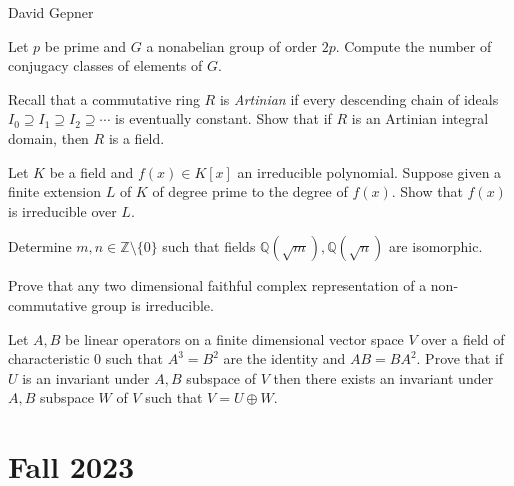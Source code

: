 \documentclass[openany]{book}
\begin{document}
David Gepner


\begin{prob}
    Let \( p \) be prime and \( G \) a nonabelian group of order \( 2p \). Compute the number of conjugacy classes of elements of \( G \).
\end{prob}


\begin{prob}
    Recall that a commutative ring \( R \) is \textit{Artinian} if every descending chain of ideals \( I_0 \supseteq I_1 \supseteq I_2 \supseteq \cdots \) is eventually constant. Show that if \( R \) is an Artinian integral domain, then \( R \) is a field.
\end{prob}




\begin{prob}
    Let \( K \) be a field and \( f(x) \in K[x] \) an irreducible polynomial. Suppose given a finite extension \( L \) of \( K \) of degree prime to the degree of \( f(x) \). Show that \( f(x) \) is irreducible over \( L \).
\end{prob}



\begin{prob}
    Determine \( m, n \in \mathbb{Z} \setminus \{0\} \) such that fields \( \mathbb{Q}(\sqrt{m}), \mathbb{Q}(\sqrt{n}) \) are isomorphic.
\end{prob}




\begin{prob}
    Prove that any two dimensional faithful complex representation of a non-commutative group is irreducible.
\end{prob}




\begin{prob}
    Let \( A, B \) be linear operators on a finite dimensional vector space \( V \) over a field of characteristic 0 such that \( A^3 = B^2 \) are the identity and \( AB = BA^2 \). Prove that if \( U \) is an invariant under \( A, B \) subspace of \( V \) then there exists an invariant under \( A, B \) subspace \( W \) of \( V \) such that \( V = U \oplus W \).
\end{prob}



\chapter{Fall 2023}
\end{document}
